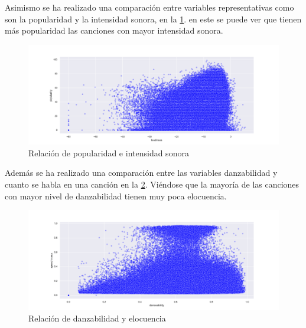 \documentclass{wsdcr}
\begin{document}
Asimismo se ha realizado una comparación entre variables representativas como son la popularidad y la intensidad sonora, en la \figurename{\ref*{fig:relacion popularidad e intensidad sonora}}. en este se puede ver que tienen más popularidad las canciones con mayor intensidad sonora.

\begin{figure}[H] \includegraphics[width=\columnwidth]{images/popularity_loudness_scatterplot.png} \caption{Relación de popularidad e intensidad sonora} \label{fig:relacion popularidad e intensidad sonora} \end{figure}

Además se ha realizado una comparación entre las variables danzabilidad y cuanto se habla en una canción en la \figurename{\ref*{fig:relacion danzabilidad y elocuencia}}. Viéndose que la mayoría de las canciones con mayor nivel de danzabilidad tienen muy poca elocuencia.

\begin{figure}[H] \includegraphics[width=\columnwidth]{images/danceability_speechiness_scatterplot.png} \caption{Relación de danzabilidad y elocuencia} \label{fig:relacion danzabilidad y elocuencia} \end{figure}
\end{document}

